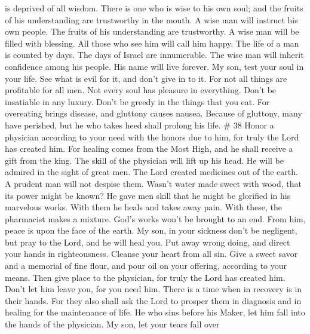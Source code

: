 is deprived of all wisdom.  There is one who is wise to
his own soul; and the fruits of his understanding are trustworthy in the
mouth.  A wise man will instruct his own people. The
fruits of his understanding are trustworthy.  A wise man
will be filled with blessing. All those who see him will call him happy.
 The life of a man is counted by days. The days of Israel
are innumerable.  The wise man will inherit confidence
among his people. His name will live forever.  My son,
test your soul in your life. See what is evil for it, and don't give in
to it.  For not all things are profitable for all men.
Not every soul has pleasure in everything.  Don't be
insatiable in any luxury. Don't be greedy in the things that you eat.
 For overeating brings disease, and gluttony causes
nausea.  Because of gluttony, many have perished, but he
who takes heed shall prolong his life. \# 38  Honor a
physician according to your need with the honors due to him, for truly
the Lord has created him.  For healing comes from the Most
High, and he shall receive a gift from the king.  The
skill of the physician will lift up his head. He will be admired in the
sight of great men.  The Lord created medicines out of the
earth. A prudent man will not despise them.  Wasn't water
made sweet with wood, that its power might be known?  He
gave men skill that he might be glorified in his marvelous works.
 With them he heals and takes away pain. 
With these, the pharmacist makes a mixture. God's works won't be brought
to an end. From him, peace is upon the face of the earth. 
My son, in your sickness don't be negligent, but pray to the Lord, and
he will heal you.  Put away wrong doing, and direct your
hands in righteousness. Cleanse your heart from all sin. 
Give a sweet savor and a memorial of fine flour, and pour oil on your
offering, according to your means.  Then give place to
the physician, for truly the Lord has created him. Don't let him leave
you, for you need him.  There is a time when in recovery
is in their hands.  For they also shall ask the Lord to
prosper them in diagnosis and in healing for the maintenance of life.
 He who sins before his Maker, let him fall into the
hands of the physician.  My son, let your tears fall over
